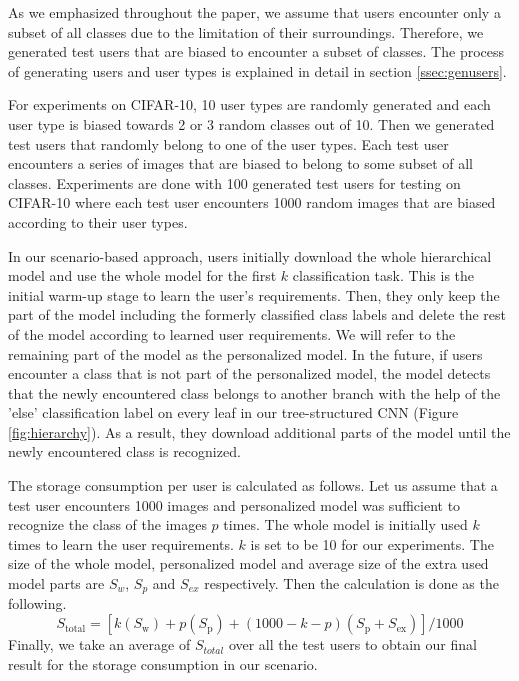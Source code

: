 As we emphasized throughout the paper, we assume that users encounter only a subset of all classes due to the limitation of their surroundings.
Therefore, we generated test users that are biased to encounter a subset of classes. 
The process of generating users and user types is explained in detail in section \ref{ssec:genusers}. 

For experiments on CIFAR-10, 10 user types are randomly generated and each user type is biased towards 2 or 3 random classes out of 10.
Then we generated test users that randomly belong to one of the user types. 
Each test user encounters a series of images that are biased to belong to some subset of all classes. 
Experiments are done with 100 generated test users for testing on CIFAR-10 where each test user encounters 1000 random images that are biased according to their user types.

In our scenario-based approach, users initially download the whole hierarchical model and use the whole model for the first $k$ classification task. 
This is the initial warm-up stage to learn the user's requirements.
Then, they only keep the part of the model including the formerly classified class labels and delete the rest of the model according to learned user requirements.
We will refer to the remaining part of the model as the personalized model.
In the future, if users encounter a class that is not part of the personalized model, the model detects that the newly encountered class belongs to another branch with the help of the 'else' classification label on every leaf in our tree-structured CNN (Figure \ref{fig:hierarchy}). 
As a result, they download additional parts of the model until the newly encountered class is recognized. 

The storage consumption per user is calculated as follows. 
Let us assume that a test user encounters 1000 images and personalized model was sufficient to recognize the class of the images $p$ times. 
The whole model is initially used $k$ times to learn the user requirements. 
$k$ is set to be 10 for our experiments.
The size of the whole model, personalized model and average size of the extra used model parts are $S_w$, $S_p$ and $S_{ex}$ respectively.
Then the calculation is done as the following.
\begin{equation}
    S_\mathrm{total} = [k(S_\mathrm{w}) + p(S_\mathrm{p}) + (1000-k-p)(S_\mathrm{p}+S_\mathrm{ex})] / 1000
\end{equation}
Finally, we take an average of $S_{total}$ over all the test users to obtain our final result for the storage consumption in our scenario.



